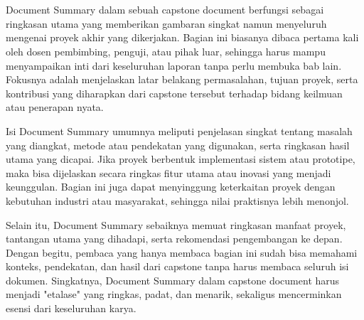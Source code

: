 \documentclass{elsinta}
\begin{document}
\coverpage
\newpage


\newpage


\clearpage
{}
\setcounter{page}{1} 
\pagestyle{myfooter} %


\tableofcontents
\newpage
\section*{\docsumary}
Document Summary dalam sebuah capstone document berfungsi sebagai ringkasan utama yang memberikan gambaran singkat namun menyeluruh mengenai proyek akhir yang dikerjakan. Bagian ini biasanya dibaca pertama kali oleh dosen pembimbing, penguji, atau pihak luar, sehingga harus mampu menyampaikan inti dari keseluruhan laporan tanpa perlu membuka bab lain. Fokusnya adalah menjelaskan latar belakang permasalahan, tujuan proyek, serta kontribusi yang diharapkan dari capstone tersebut terhadap bidang keilmuan atau penerapan nyata.

Isi Document Summary umumnya meliputi penjelasan singkat tentang masalah yang diangkat, metode atau pendekatan yang digunakan, serta ringkasan hasil utama yang dicapai. Jika proyek berbentuk implementasi sistem atau prototipe, maka bisa dijelaskan secara ringkas fitur utama atau inovasi yang menjadi keunggulan. Bagian ini juga dapat menyinggung keterkaitan proyek dengan kebutuhan industri atau masyarakat, sehingga nilai praktisnya lebih menonjol.

Selain itu, Document Summary sebaiknya memuat ringkasan manfaat proyek, tantangan utama yang dihadapi, serta rekomendasi pengembangan ke depan. Dengan begitu, pembaca yang hanya membaca bagian ini sudah bisa memahami konteks, pendekatan, dan hasil dari capstone tanpa harus membaca seluruh isi dokumen. Singkatnya, Document Summary dalam capstone document harus menjadi "etalase" yang ringkas, padat, dan menarik, sekaligus mencerminkan esensi dari keseluruhan karya.
\newpage
\end{document}
